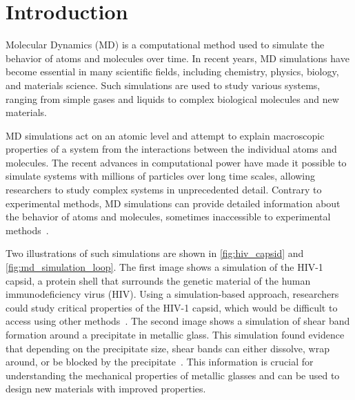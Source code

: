 \chapter{Introduction}
\label{sec:intro}

Molecular Dynamics (MD) is a computational method used to simulate the behavior of atoms and molecules over time. In recent years, MD simulations have become essential in many scientific fields, including chemistry, physics, biology, and materials science. Such simulations are used to study various systems, ranging from simple gases and liquids to complex biological molecules and new materials.

MD simulations act on an atomic level and attempt to explain macroscopic properties of a system from the interactions between the individual atoms and molecules. The recent advances in computational power have made it possible to simulate systems with millions of particles over long time scales, allowing researchers to study complex systems in unprecedented detail. Contrary to experimental methods, MD simulations can provide detailed information about the behavior of atoms and molecules, sometimes inaccessible to experimental methods~\cite{Perilla2017}.

Two illustrations of such simulations are shown in \autoref{fig:hiv_capsid} and \autoref{fig:md_simulation_loop}. The first image shows a simulation of the HIV-1 capsid, a protein shell that surrounds the genetic material of the human immunodeficiency virus (HIV). Using a simulation-based approach, researchers could study critical properties of the HIV-1 capsid, which would be difficult to access using other methods~\cite{Perilla2017}. The second image shows a simulation of shear band formation around a precipitate in metallic glass. This simulation found evidence that depending on the precipitate size, shear bands can either dissolve, wrap around, or be blocked by the precipitate~\cite{Brink2016}. This information is crucial for understanding the mechanical properties of metallic glasses and can be used to design new materials with improved properties.


